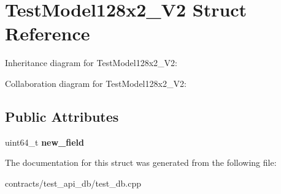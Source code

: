 \hypertarget{struct_test_model128x2___v2}{}\section{Test\+Model128x2\+\_\+\+V2 Struct Reference}
\label{struct_test_model128x2___v2}


Inheritance diagram for Test\+Model128x2\+\_\+\+V2\+:


Collaboration diagram for Test\+Model128x2\+\_\+\+V2\+:
\subsection*{Public Attributes}
\begin{DoxyCompactItemize}
\item 
\mbox{\label{struct_test_model128x2___v2_af0e5083368419917c205dd763be5f9b7}} 
uint64\+\_\+t {\bfseries new\+\_\+field}
\end{DoxyCompactItemize}


The documentation for this struct was generated from the following file\+:\begin{DoxyCompactItemize}
\item 
contracts/test\+\_\+api\+\_\+db/test\+\_\+db.\+cpp\end{DoxyCompactItemize}
